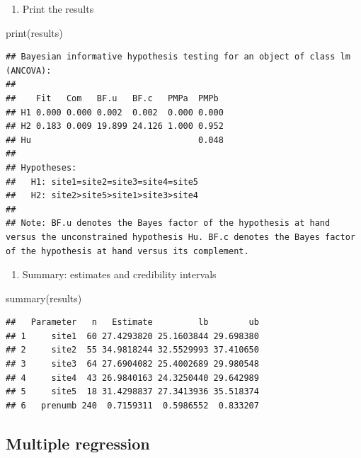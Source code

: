 \documentclass[
]{book}
\newenvironment{Shaded}{\begin{snugshade}}{\end{snugshade}}
\newcommand{\FunctionTok}[1]{\textcolor[rgb]{0.00,0.00,0.00}{#1}}
\newcommand{\NormalTok}[1]{#1}
\providecommand{\tightlist}{%
  \setlength{\itemsep}{0pt}\setlength{\parskip}{0pt}}
\begin{document}
\begin{enumerate}
\def\labelenumi{\arabic{enumi})}
\setcounter{enumi}{3}
\tightlist
\item
  Print the results
\end{enumerate}

\begin{Shaded}
\begin{Highlighting}[]
\FunctionTok{print}\NormalTok{(results)}
\end{Highlighting}
\end{Shaded}

\begin{verbatim}
## Bayesian informative hypothesis testing for an object of class lm (ANCOVA):
## 
##    Fit   Com   BF.u   BF.c   PMPa  PMPb 
## H1 0.000 0.000 0.002  0.002  0.000 0.000
## H2 0.183 0.009 19.899 24.126 1.000 0.952
## Hu                                 0.048
## 
## Hypotheses:
##   H1: site1=site2=site3=site4=site5
##   H2: site2>site5>site1>site3>site4
## 
## Note: BF.u denotes the Bayes factor of the hypothesis at hand versus the unconstrained hypothesis Hu. BF.c denotes the Bayes factor of the hypothesis at hand versus its complement.
\end{verbatim}

\begin{enumerate}
\def\labelenumi{\arabic{enumi})}
\setcounter{enumi}{4}
\tightlist
\item
  Summary: estimates and credibility intervals
\end{enumerate}

\begin{Shaded}
\begin{Highlighting}[]
\FunctionTok{summary}\NormalTok{(results)}
\end{Highlighting}
\end{Shaded}

\begin{verbatim}
##   Parameter   n   Estimate         lb        ub
## 1     site1  60 27.4293820 25.1603844 29.698380
## 2     site2  55 34.9818244 32.5529993 37.410650
## 3     site3  64 27.6904082 25.4002689 29.980548
## 4     site4  43 26.9840163 24.3250440 29.642989
## 5     site5  18 31.4298837 27.3413936 35.518374
## 6   prenumb 240  0.7159311  0.5986552  0.833207
\end{verbatim}

\hypertarget{multiple-regression}{%
\subsection{Multiple regression}\label{multiple-regression}}
\end{document}
